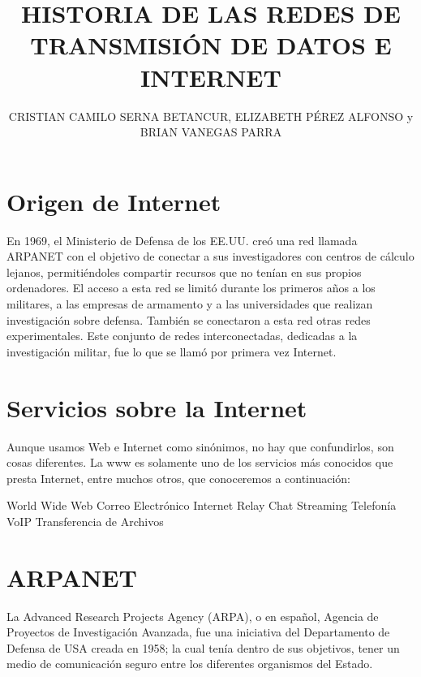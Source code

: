 \documentclass[letterpaper, 10 pt, conference]{ieeeconf}  %
\title{\LARGE \bf
    HISTORIA DE LAS REDES DE TRANSMISIÓN DE DATOS E INTERNET
}
\author{CRISTIAN CAMILO SERNA BETANCUR, ELIZABETH PÉREZ ALFONSO y BRIAN VANEGAS PARRA
}
\begin{document}
\maketitle
\thispagestyle{empty}
\pagestyle{empty}






\section{Origen de Internet}

En 1969, el Ministerio de Defensa de los EE.UU. creó una red llamada ARPANET con el objetivo de conectar a sus investigadores con centros de cálculo lejanos, permitiéndoles compartir recursos que no tenían en sus propios ordenadores. El acceso a esta red se limitó durante los primeros años a los militares, a las empresas de armamento y a las universidades que realizan investigación sobre defensa. También se conectaron a esta red otras redes experimentales. Este conjunto de redes interconectadas, dedicadas a la investigación militar, fue lo que se llamó por primera vez Internet.

\section{Servicios sobre la Internet}

Aunque usamos Web e Internet como sinónimos, no hay que confundirlos, son cosas diferentes. La www es solamente uno de los servicios más conocidos que presta Internet, entre muchos otros, que conoceremos a continuación: 

World Wide Web
Correo Electrónico
Internet Relay Chat
Streaming
Telefonía VoIP
Transferencia de Archivos


\section{ARPANET}

La Advanced Research Projects Agency (ARPA), o en español, Agencia de Proyectos de Investigación Avanzada, fue una iniciativa del Departamento de Defensa de USA creada en 1958; la cual tenía dentro de sus objetivos, tener un medio de comunicación seguro entre los diferentes organismos del Estado. 
\end{document}
